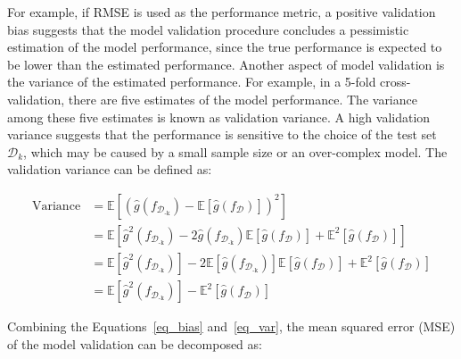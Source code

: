 For example, if RMSE is used as the performance metric, a positive validation bias suggests that the model validation procedure concludes a pessimistic estimation of the model performance, since the true performance is expected to be lower than the estimated performance.
Another aspect of model validation is the variance of the estimated performance. For example, in a 5-fold cross-validation, there are five estimates of the model performance. The variance among these five estimates is known as validation variance. A high validation variance suggests that the performance is sensitive to the choice of the test set $\mathcal{D}_k$, which may be caused by a small sample size or an over-complex model. The validation variance can be defined as:

\begin{equation} \label{eq_var}
    \begin{split}
        \mathrm{Variance}&=\mathbb{E}[(\hat{g}(f_{\mathcal{D}_{\text{-k}}})-\mathbb{E}[\hat{g}(f_\mathcal{D})])^{2}]\\
        &=\mathbb{E}[{\hat{g}}^2(f_{\mathcal{D}_{\text{-k}}}) - 2\hat{g}(f_{\mathcal{D}_{\text{-k}}})\mathbb{E}[\hat{g}(f_\mathcal{D})] + \mathbb{E}^{2}[\hat{g}(f_{\mathcal{D}})]]\\
        &=\mathbb{E}[{\hat{g}}^2(f_{\mathcal{D}_{\text{-k}}})] - 2\mathbb{E}[\hat{g}(f_{\mathcal{D}_{\text{-k}}})]\mathbb{E}[\hat{g}(f_{\mathcal{D}})] + \mathbb{E}^{2}[\hat{g}(f_{\mathcal{D}})]\\
        &=\mathbb{E}[{\hat{g}}^2(f_{\mathcal{D}_{\text{-k}}})] - \mathbb{E}^{2}[\hat{g}(f_{\mathcal{D}})]
    \end{split}
\end{equation}

Combining the Equations~\ref{eq_bias} and~\ref{eq_var}, the mean squared error (MSE) of the model validation can be decomposed as:

